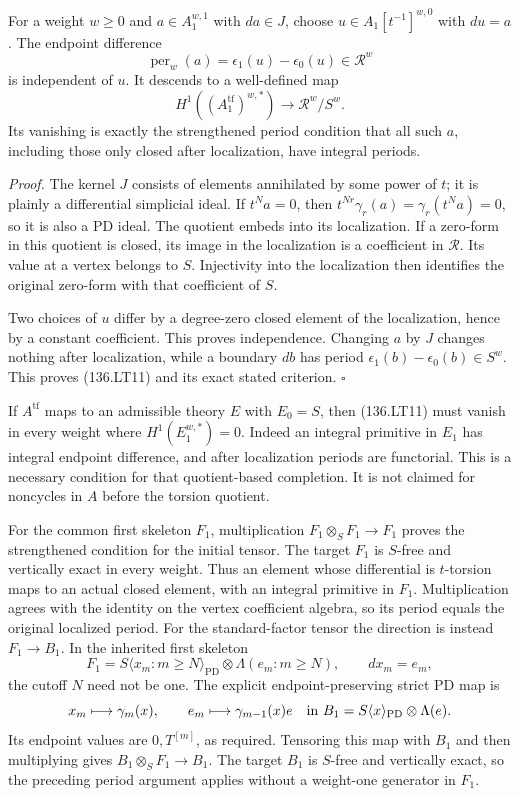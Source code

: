 For a weight \(w\geq0\) and \(a\in A_1^{w,1}\) with \(da\in J\),
choose \(u\in A_1[t^{-1}]^{w,0}\) with \(du=a\).
The endpoint difference
\[
       \operatorname{per}_w(a)=\epsilon_1(u)-\epsilon_0(u)
                      \in\mathcal R^w
 \tag{136.LT10}
\]
is independent of \(u\). It descends to a well-defined map
\[
 H^1((A^{\mathrm{tf}}_1)^{w,*})
                  \longrightarrow \mathcal R^w/S^w.
 \tag{136.LT11}
\]
Its vanishing is exactly the strengthened period condition
that all such \(a\), including those only closed after
localization, have integral periods.

\emph{Proof.}
The kernel \(J\) consists of elements annihilated by some
power of \(t\); it is plainly a differential simplicial
ideal. If \(t^Na=0\), then
\(t^{Nr}\gamma_r(a)=\gamma_r(t^Na)=0\), so it is also a
PD ideal. The quotient embeds into its localization.
If a zero-form in this quotient is closed, its image in
the localization is a coefficient in \(\mathcal R\).
Its value at a vertex belongs to \(S\). Injectivity into
the localization then identifies the original zero-form
with that coefficient of \(S\).

Two choices of \(u\) differ by a degree-zero closed
element of the localization, hence by a constant
coefficient. This proves independence. Changing \(a\)
by \(J\) changes nothing after localization, while a
boundary \(db\) has period
\(\epsilon_1(b)-\epsilon_0(b)\in S^w\). This proves
(136.LT11) and its exact stated criterion.
\hfill\(\square\)

If \(A^{\mathrm{tf}}\) maps to an admissible theory \(E\)
with \(E_0=S\), then (136.LT11) must vanish in every weight
where \(H^1(E_1^{w,*})=0\). Indeed an integral primitive in
\(E_1\) has integral endpoint difference, and after
localization periods are functorial. This is a necessary
condition for that quotient-based completion. It is not
claimed for noncycles in \(A\) before the torsion quotient.

For the common first skeleton \(F_1\), multiplication
\(F_1\otimes_SF_1\to F_1\) proves the strengthened condition
for the initial tensor. The target \(F_1\) is \(S\)-free
and vertically exact in every weight. Thus an element
whose differential is \(t\)-torsion maps to an actual
closed element, with an integral primitive in \(F_1\).
Multiplication agrees with the identity on the vertex
coefficient algebra, so its period equals the original
localized period. For the standard-factor tensor the direction
is instead \(F_1\to B_1\). In the inherited first skeleton
\[
 F_1=S\langle x_m:m\geq N\rangle_{\mathrm{PD}}
                     \otimes\Lambda(e_m:m\geq N),
 \qquad dx_m=e_m,
\]
the cutoff \(N\) need not be one. The explicit
endpoint-preserving strict PD map is
\[
 x_m\longmapsto\gamma_m(x),\qquad
 e_m\longmapsto\gamma_{m-1}(x)e
 \quad\hbox{in }B_1=S\langle x\rangle_{\mathrm{PD}}\otimes\Lambda(e).
\]
Its endpoint values are \(0,T^{[m]}\), as required.
Tensoring this map with \(B_1\) and then multiplying gives
\(B_1\otimes_SF_1\to B_1\). The target \(B_1\) is
\(S\)-free and vertically exact, so the preceding period
argument applies without a weight-one generator in \(F_1\).

